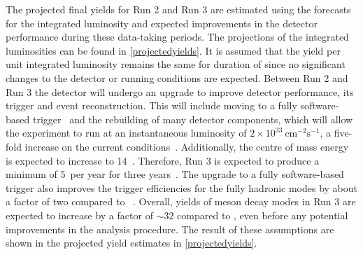 The projected final yields for Run 2 and Run 3 are estimated using the forecasts for the integrated luminosity and expected improvements in the detector performance during these data-taking periods. The projections of the integrated luminosities can be found in \tab\ref{projectedyields}. It is assumed that the yield per unit integrated luminosity remains the same for duration of \runtwo since no significant changes to the detector or running conditions are expected. Between Run 2 and Run 3 the detector will undergo an upgrade to improve detector performance, its trigger and event reconstruction. This will include moving to a fully software-based trigger~\cite{CERN-LHCC-2014-016} and the rebuilding of many detector components, which will allow the experiment to run at an instantaneous luminosity of $2 \times 10^{33}~\text{cm}^{-2}\text{s}^{-1}$, a five-fold increase on the current conditions~\cite{CERN-LHCC-2014-016}. Additionally, the centre of mass energy is expected to increase to 14~\tev. Therefore, Run 3 is expected to produce a minimum of 5~\invfb per year for three years~\cite{CERN-LHCC-2014-016}. The upgrade to a fully software-based trigger also improves the trigger efficiencies for the fully hadronic modes by about a factor of two compared to \runone~\cite{CERN-LHCC-2014-016}. Overall, yields of \B meson decay modes in Run 3 are expected to increase by a factor of $\sim$32 compared to \runone, even before any potential improvements in the analysis procedure. The result of these assumptions are shown in the projected yield estimates in \tab\ref{projectedyields}.

\begin{table}
\caption{Yields and projected yields for the data-taking periods of the LHC. The entries in bold are projected yields, whereas the other entries refer to data used in this thesis. Projected results are justified in the text, with information taken from Ref.~\cite{CERN-LHCC-2014-016}.}
\label{projectedyields}
\end{table}

